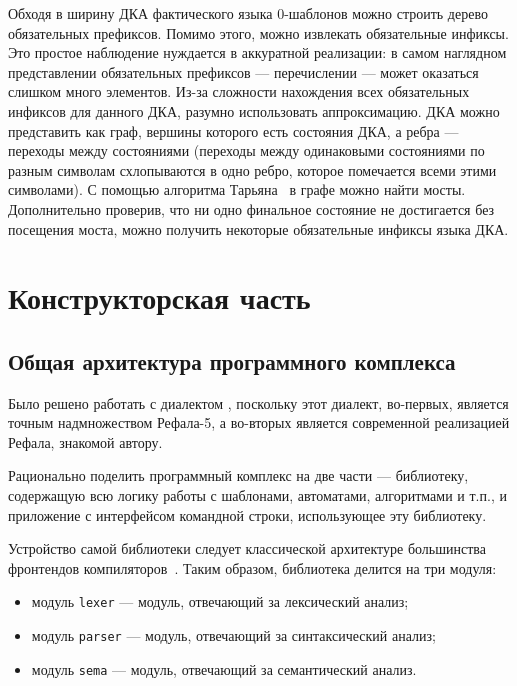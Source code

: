 Обходя в ширину ДКА фактического языка $0$-шаблонов можно строить дерево обязательных префиксов.
Помимо этого, можно извлекать обязательные инфиксы. Это простое наблюдение нуждается в аккуратной реализации: в самом наглядном представлении обязательных префиксов --- перечислении --- может оказаться слишком много элементов. Из-за сложности нахождения 
всех обязательных инфиксов для данного ДКА, разумно использовать аппроксимацию.
ДКА можно представить как граф, вершины которого есть состояния ДКА, а ребра --- переходы между состояниями (переходы между одинаковыми состояниями по разным символам схлопываются в одно ребро, которое помечается всеми этими символами). С помощью алгоритма Тарьяна~\cite{tarjan1974bridges} в графе можно найти мосты. Дополнительно проверив,
что ни одно финальное состояние не достигается без посещения  моста, можно 
получить некоторые обязательные инфиксы языка ДКА.

\section{Конструкторская часть}

\subsection{Общая архитектура программного комплекса} %

Было решено работать с диалектом \RL, поскольку этот диалект, во-первых, является точным 
надмножеством Рефала-5, а во-вторых является современной реализацией Рефала, знакомой автору.

Рационально поделить программный комплекс на две части --- библиотеку, содержащую всю 
логику работы с шаблонами, автоматами, алгоритмами и т.п., и приложение с интерфейсом командной строки, использующее 
эту библиотеку.

Устройство самой библиотеки следует классической архитектуре большинства фронтендов компиляторов~\cite{aho2006compilers}. 
Таким образом, библиотека делится на три модуля:
\begin{itemize}
\item модуль \texttt{lexer} --- модуль, отвечающий за лексический анализ;
\item модуль \texttt{parser} --- модуль, отвечающий за синтаксический анализ;
\item модуль \texttt{sema} --- модуль, отвечающий за семантический анализ.
\end{itemize}

